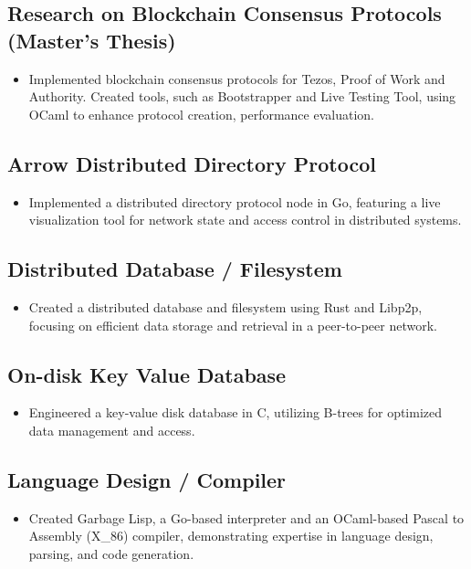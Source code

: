 \documentclass[a4paper, 12pt]{article}
\begin{document}
\subsection{Research on Blockchain Consensus Protocols (Master's Thesis)}
\begin{itemize}
  \item Implemented blockchain consensus protocols for Tezos, Proof of Work and Authority. Created tools, such as Bootstrapper and Live Testing Tool, using OCaml to enhance protocol creation, performance evaluation.
\end{itemize}

\subsection{Arrow Distributed Directory Protocol}
\begin{itemize}
  \item Implemented a distributed directory protocol node in Go, featuring a live visualization tool for network state and access control in distributed systems.
\end{itemize}

\subsection{Distributed Database / Filesystem}
\begin{itemize}
  \item Created a distributed database and filesystem using Rust and Libp2p, focusing on efficient data storage and retrieval in a peer-to-peer network.
\end{itemize}

\subsection{On-disk Key Value Database}
\begin{itemize}
  \item Engineered a key-value disk database in C, utilizing B-trees for optimized data management and access.
\end{itemize}

\subsection{Language Design / Compiler}
\begin{itemize}
  \item Created Garbage Lisp, a Go-based interpreter and an OCaml-based Pascal to Assembly (X\_86) compiler, demonstrating expertise in language design, parsing, and code generation.
\end{itemize}
\end{document}
